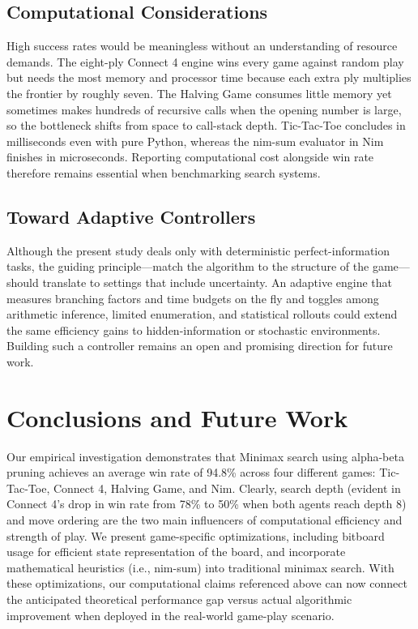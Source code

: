 \documentclass[12pt]{article}
\begin{document}
\subsection{Computational Considerations}

High success rates would be meaningless without an understanding of resource demands. The eight-ply Connect 4 engine wins every game against random play but needs the most memory and processor time because each extra ply multiplies the frontier by roughly seven. The Halving Game consumes little memory yet sometimes makes hundreds of recursive calls when the opening number is large, so the bottleneck shifts from space to call-stack depth. Tic-Tac-Toe concludes in milliseconds even with pure Python, whereas the nim-sum evaluator in Nim finishes in microseconds. Reporting computational cost alongside win rate therefore remains essential when benchmarking search systems.

\subsection{Toward Adaptive Controllers}

Although the present study deals only with deterministic perfect-information tasks, the guiding principle—match the algorithm to the structure of the game—should translate to settings that include uncertainty. An adaptive engine that measures branching factors and time budgets on the fly and toggles among arithmetic inference, limited enumeration, and statistical rollouts could extend the same efficiency gains to hidden-information or stochastic environments. Building such a controller remains an open and promising direction for future work.

\section{Conclusions and Future Work}

Our empirical investigation demonstrates that Minimax search using alpha-beta pruning achieves an average win rate of 94.8\% across four different games: Tic-Tac-Toe, Connect 4, Halving Game, and Nim. Clearly, search depth (evident in Connect 4's drop in win rate from 78\% to 50\% when both agents reach depth 8) and move ordering are the two main influencers of computational efficiency and strength of play. We present game-specific optimizations, including bitboard usage for efficient state representation of the board, and incorporate mathematical heuristics (i.e., nim-sum) into traditional minimax search. With these optimizations, our computational claims referenced above can now connect the anticipated theoretical performance gap versus actual algorithmic improvement when deployed in the real-world game-play scenario.
\end{document}
